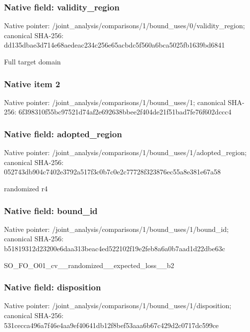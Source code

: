 \documentclass[10pt,a4paper]{article}
\begin{document}
\subsubsection{Native field: validity\_\allowbreak{}region}
Native pointer: /joint\_\allowbreak{}analysis/comparisons/1/bound\_\allowbreak{}uses/0/validity\_\allowbreak{}region; canonical SHA-256: dd135dbae3d714e68aedeac234c256e65acbdc5f560a6bca5025fb1639bd6841

\begingroup\raggedright\sloppy Full target domain\par\endgroup

\subsubsection{Native item 2}
Native pointer: /joint\_\allowbreak{}analysis/comparisons/1/bound\_\allowbreak{}uses/1; canonical SHA-256: 6f398310f55bc97521d74af2e692638bbee2f404de21f51bad7fe76f602dccc4

\subsubsection{Native field: adopted\_\allowbreak{}region}
Native pointer: /joint\_\allowbreak{}analysis/comparisons/1/bound\_\allowbreak{}uses/1/adopted\_\allowbreak{}region; canonical SHA-256: 052743db904c7402e3792a517f3c0b7c0e2c77728f323876ec55a8e381e67a58

\begingroup\raggedright\sloppy randomized r4\par\endgroup

\subsubsection{Native field: bound\_\allowbreak{}id}
Native pointer: /joint\_\allowbreak{}analysis/comparisons/1/bound\_\allowbreak{}uses/1/bound\_\allowbreak{}id; canonical SHA-256: b51819312d23200e6daa313beac4ed522102f19e2feb8a6a0b7aad1d22dbe63c

\begingroup\raggedright\sloppy SO\_\allowbreak{}FO\_\allowbreak{}O01\_\allowbreak{}cv\_\allowbreak{}\_\allowbreak{}randomized\_\allowbreak{}\_\allowbreak{}expected\_\allowbreak{}loss\_\allowbreak{}\_\allowbreak{}b2\par\endgroup

\subsubsection{Native field: disposition}
Native pointer: /joint\_\allowbreak{}analysis/comparisons/1/bound\_\allowbreak{}uses/1/disposition; canonical SHA-256: 531cecca496a7f46e4aa9ef40641db12f8bef53aaa6b67c429d2c0717dc599ce
\end{document}
